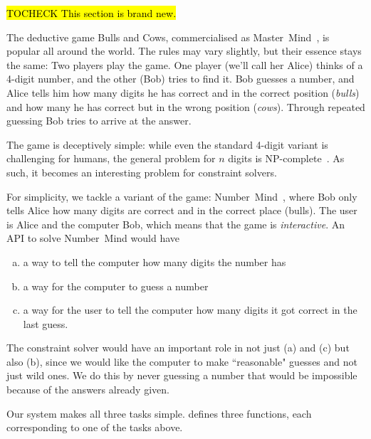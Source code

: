\hl{TOCHECK This section is brand new.}

The deductive game Bulls and Cows, commercialised as
Master~Mind~\cite{mastermind}, is popular all around the world. The rules may
vary slightly, but their essence stays the same: Two players play the game.
One player (we'll call her Alice) thinks of a 4-digit number, and the other
(Bob) tries to find it. Bob guesses a number, and Alice tells him how many
digits he has correct and in the correct position (\textit{bulls}) and how
many he has correct but in the wrong position (\textit{cows}). Through
repeated guessing Bob tries to arrive at the answer.

The game is deceptively simple: while even the standard 4-digit variant is
challenging for humans, the general problem for $n$ digits is
NP-complete~\cite{mastermindnpc}. As such, it becomes an interesting problem for
constraint solvers.

For simplicity, we tackle a variant of the game:
Number~Mind~\cite{numbermind}, where Bob only tells Alice how many digits are
correct and in the correct place (bulls). The user is Alice and the computer
Bob, which means that the game is \textit{interactive}. An API to solve
Number~Mind would have

\begin{enumerate}[(a)]
\item a way to tell the computer how many digits the number has
\item a way for the computer to guess a number
\item a way for the user to tell the computer how many digits it got correct
  in the last guess.
\end{enumerate}

The constraint solver would have an important role in not just (a) and (c) but
also (b), since we would like the computer to make ``reasonable" guesses and
not just wild ones. We do this by never guessing a number that would be
impossible because of the answers already given.

Our system makes all three tasks simple.  defines three
functions, each corresponding to one of the tasks above.

